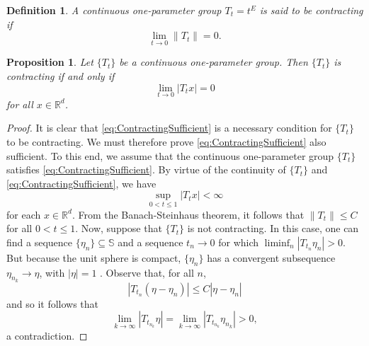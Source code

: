 \documentclass[11pt, letter]{book}
\newtheorem{definition}[theorem]{Definition}
\newtheorem{proposition}[theorem]{Proposition}
\begin{document}
\begin{definition} A continuous one-parameter group $T_t=t^E$ is said to be \textit{contracting} if
\begin{equation*}
\lim_{t\to 0}\|T_t\|=0. 
\end{equation*}
\end{definition}

\begin{proposition}
Let $\{T_t\}$ be a continuous one-parameter group. Then $\{T_t\}$ is contracting if and only if
\begin{equation}\label{eq:ContractingSufficient}
\lim_{t\to 0}|T_tx|=0
\end{equation}
for all $x\in\mathbb{R}^d$.
\end{proposition}

\begin{proof}
It is clear that \eqref{eq:ContractingSufficient} is a necessary condition for $\{T_t\}$ to be contracting. We must therefore prove \eqref{eq:ContractingSufficient} also sufficient. To this end, we assume that the continuous one-parameter group $\{T_t\}$ satisfies \eqref{eq:ContractingSufficient}. By virtue of the continuity of $\{T_t\}$ and \eqref{eq:ContractingSufficient}, we have
\begin{equation*}
\sup_{0<t\leq 1}|T_t x|<\infty
 \end{equation*}
for each $x\in\mathbb{R}^d$. From the Banach-Steinhaus theorem, it follows that $\|T_t\|\leq C$ for all $0<t\leq 1$. Now, suppose that $\{T_t\}$ is not contracting. In this case, one can find a sequence $\{\eta_n\}\subseteq\mathbb{S}$ and a sequence $t_n\rightarrow 0$ for which $\liminf_n|T_{t_n}\eta_n|>0$. But because the unit sphere is compact, $\{\eta_n\}$ has a convergent subsequence $\eta_{n_k}\rightarrow \eta$, with $|\eta|=1$ . Observe that, for all $n$,
 \begin{equation*}
 |T_{t_n}(\eta-\eta_n)|\leq C|\eta-\eta_n|
 \end{equation*}
 and so it follows that
 \begin{equation*}
 \lim_{k\rightarrow\infty}|T_{t_{n_k}}\eta|=\lim_{k\rightarrow\infty}|T_{t_{n_k}}\eta_{n_k}|>0,
 \end{equation*}
 a contradiction.
 \end{proof}
\end{document}
